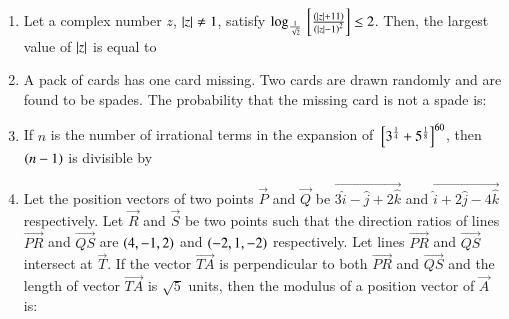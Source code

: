 \documentclass[journal]{IEEEtran}
\numberwithin{equation}{enumi}
\numberwithin{figure}{enumi}
\begin{document}
\begin{enumerate}
    \item
    Let a complex number $z$, $\left\vert z\right\vert \neq 1$, satisfy $\log_{\frac{1}{\sqrt{2}}} {}\left[\frac{\left(\left\vert z\right\vert + 11\right)}{\left(\left\vert z\right\vert - 1\right)^2}\right] \leq 2$. Then, the largest value of $\left\vert z\right\vert$ is equal to 

    \hfill{}
    
    \begin{enumerate}
    \end{enumerate}
    
    \item 
    A pack of cards has one card missing. Two cards are drawn randomly and are found to be spades. The probability that the missing card is not a spade is:
    \begin{enumerate}
    \end{enumerate}

    \item 
    If $n$ is the number of irrational terms in the expansion of ${}\left[3^{\frac{1}{4}} + 5^{\frac{1}{8}}\right]^{60}$, then $\left(n - 1\right)$ is divisible by

    \hfill{}
    
    \begin{enumerate}
    \end{enumerate}

    \item 
    Let the position vectors of two points $\vec{P}$ and $\vec{Q}$ be $\vec{3\hat{i} - \hat{j} + 2\hat{k}}$ and $\vec{\hat{i} + 2\hat{j} - 4\hat{k}}$ respectively. Let $\vec{R}$ and $\vec{S}$ be two points such that the direction ratios of lines $\vec{PR}$ and $\vec{QS}$ are $\left(4, -1, 2\right)$ and $\left(-2,1,-2\right)$ respectively. Let lines $\vec{PR}$ and $\vec{QS}$ intersect at $\vec{T}$. If the vector $\vec{TA}$ is perpendicular to both $\vec{PR}$ and $\vec{QS}$ and the length of vector $\vec{TA}$ is $\sqrt{5}$ units, then the modulus of a position vector of $\vec{A}$ is:


\end{enumerate}
\end{document}
